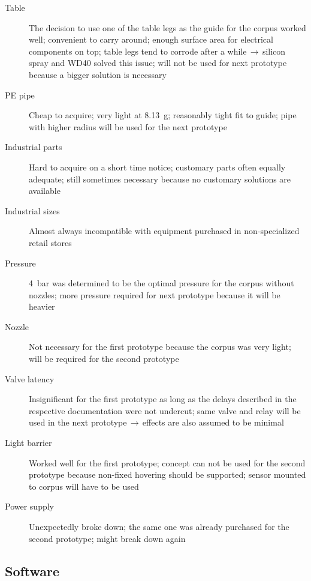\begin{description}
\item [Table] The decision to use one of the table legs as the guide for the corpus worked well; convenient to carry around; enough surface area for electrical components on top; table legs tend to corrode after a while$\,\to\,$silicon spray and WD40 solved this issue; will not be used for next prototype because a bigger solution is necessary
\item [PE pipe] Cheap to acquire; very light at \SI{8,13}{\gram}; reasonably tight fit to guide; pipe with higher radius will be used for the next prototype
\item [Industrial parts] Hard to acquire on a short time notice; customary parts often equally adequate; still sometimes necessary because no customary solutions are available
\item [Industrial sizes] Almost always incompatible with equipment purchased in non-specialized retail stores
\item [Pressure] \SI{4}{\bar} was determined to be the optimal pressure for the corpus without nozzles; more pressure required for next prototype because it will be heavier
\item [Nozzle] Not necessary for the first prototype because the corpus was very light; will be required for the second prototype
\item [Valve latency] Insignificant for the first prototype as long as the delays described in the respective documentation were not undercut; same valve and relay will be used in the next prototype$\,\to\,$effects are also assumed to be minimal
\item [Light barrier] Worked well for the first prototype; concept can not be used for the second prototype because non-fixed hovering should be supported; sensor mounted to corpus will have to be used
\item [Power supply] Unexpectedly broke down; the same one was already purchased for the second prototype; might break down again
\end{description}

\subsection{Software}
\author{Philip Trauner}

